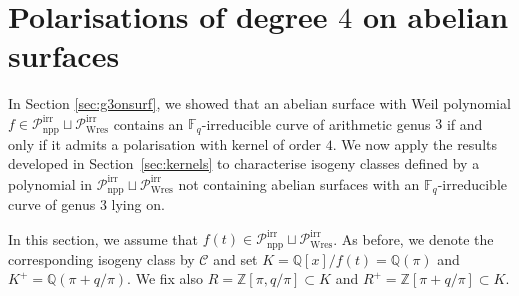 \documentclass[11pt]{amsart}
\newcommand\Fq{\mathbb{F}_q}
\newcommand\Q{\mathbb{Q}}
\newcommand\Z{\mathbb{Z}}
\newcommand\cC{\mathcal{C}}
\theoremstyle{plain}
\theoremstyle{definition}
\newcommand\PirrA{\mathcal{P}^\mathrm{irr}_\mathrm{npp}}
\newcommand\PirrB{\mathcal{P}^\mathrm{irr}_\mathrm{Wres}}
\begin{document}
\section{Polarisations of degree \texorpdfstring{$4$}{4} on abelian surfaces}\label{sec:pols4}
In Section \ref{sec:g3onsurf}, we showed that an abelian surface with Weil polynomial $f\in\PirrA\sqcup\PirrB$ contains an $\Fq$-irreducible curve of arithmetic genus $3$ if and only if it admits a polarisation with kernel of order $4$. 
We now apply the results developed in Section~\ref{sec:kernels} to characterise isogeny classes defined by a polynomial in $\PirrA\sqcup\PirrB$ not containing abelian surfaces with an $\Fq$-irreducible curve of genus $3$ lying on.

In this section, we assume that $f(t) \in \PirrA\sqcup\PirrB$.
As before, we denote the corresponding isogeny class by $\cC$ and set $K=\Q[x]/f(t)=\Q(\pi)$ and $K^+=\Q(\pi+q/\pi)$.
We fix also $R=\Z[\pi,q/\pi] \subset K$ and $R^+=\Z[\pi+q/\pi] \subset K$.
\end{document}
